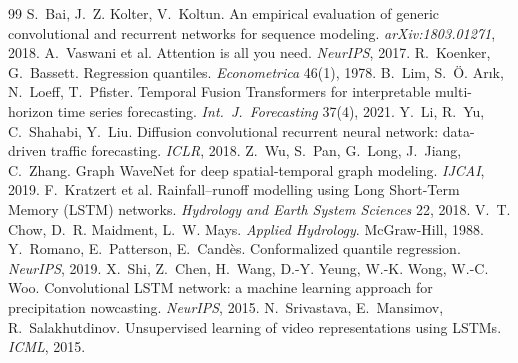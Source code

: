 \documentclass[11pt,a4paper]{article}
\begin{document}
\clearpage
{\small
\begin{thebibliography}{99}\setlength{\itemsep}{0pt}
 S.~Bai, J.~Z. Kolter, V.~Koltun. An empirical evaluation of generic convolutional and recurrent networks for sequence modeling. \emph{arXiv:1803.01271}, 2018.
 A.~Vaswani et al. Attention is all you need. \emph{NeurIPS}, 2017.
 R.~Koenker, G.~Bassett. Regression quantiles. \emph{Econometrica} 46(1), 1978.
 B.~Lim, S.~\"O. Ar{\i}k, N.~Loeff, T.~Pfister. Temporal Fusion Transformers for interpretable multi-horizon time series forecasting. \emph{Int.\ J.\ Forecasting} 37(4), 2021.
 Y.~Li, R.~Yu, C.~Shahabi, Y.~Liu. Diffusion convolutional recurrent neural network: data-driven traffic forecasting. \emph{ICLR}, 2018.
 Z.~Wu, S.~Pan, G.~Long, J.~Jiang, C.~Zhang. Graph WaveNet for deep spatial-temporal graph modeling. \emph{IJCAI}, 2019.
 F.~Kratzert et al. Rainfall--runoff modelling using Long Short-Term Memory (LSTM) networks. \emph{Hydrology and Earth System Sciences} 22, 2018.
 V.~T. Chow, D.~R. Maidment, L.~W. Mays. \emph{Applied Hydrology}. McGraw-Hill, 1988.
 Y.~Romano, E.~Patterson, E.~Cand\`es. Conformalized quantile regression. \emph{NeurIPS}, 2019.
 X.~Shi, Z.~Chen, H.~Wang, D.-Y. Yeung, W.-K. Wong, W.-C. Woo. Convolutional LSTM network: a machine learning approach for precipitation nowcasting. \emph{NeurIPS}, 2015.
 N.~Srivastava, E.~Mansimov, R.~Salakhutdinov. Unsupervised learning of video representations using LSTMs. \emph{ICML}, 2015.
\end{thebibliography}
}

\end{document}
